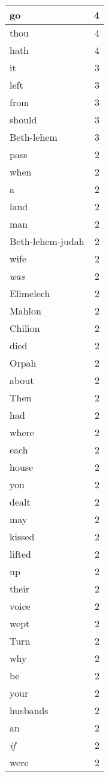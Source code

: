 \begin{center}
\begin{longtable}{l|r}
go & 4 \\ \hline
thou & 4 \\ \hline
hath & 4 \\ \hline
it & 3 \\ \hline
left & 3 \\ \hline
from & 3 \\ \hline
should & 3 \\ \hline
Beth-lehem & 3 \\ \hline
pass & 2 \\ \hline
when & 2 \\ \hline
a & 2 \\ \hline
land & 2 \\ \hline
man & 2 \\ \hline
Beth-lehem-judah & 2 \\ \hline
wife & 2 \\ \hline
\emph{was} & 2 \\ \hline
Elimelech & 2 \\ \hline
Mahlon & 2 \\ \hline
Chilion & 2 \\ \hline
died & 2 \\ \hline
Orpah & 2 \\ \hline
about & 2 \\ \hline
Then & 2 \\ \hline
had & 2 \\ \hline
where & 2 \\ \hline
each & 2 \\ \hline
house & 2 \\ \hline
you & 2 \\ \hline
dealt & 2 \\ \hline
may & 2 \\ \hline
kissed & 2 \\ \hline
lifted & 2 \\ \hline
up & 2 \\ \hline
their & 2 \\ \hline
voice & 2 \\ \hline
wept & 2 \\ \hline
Turn & 2 \\ \hline
why & 2 \\ \hline
be & 2 \\ \hline
your & 2 \\ \hline
husbands & 2 \\ \hline
an & 2 \\ \hline
\emph{if} & 2 \\ \hline
were & 2 \\ \hline

\end{longtable}
\end{center}
